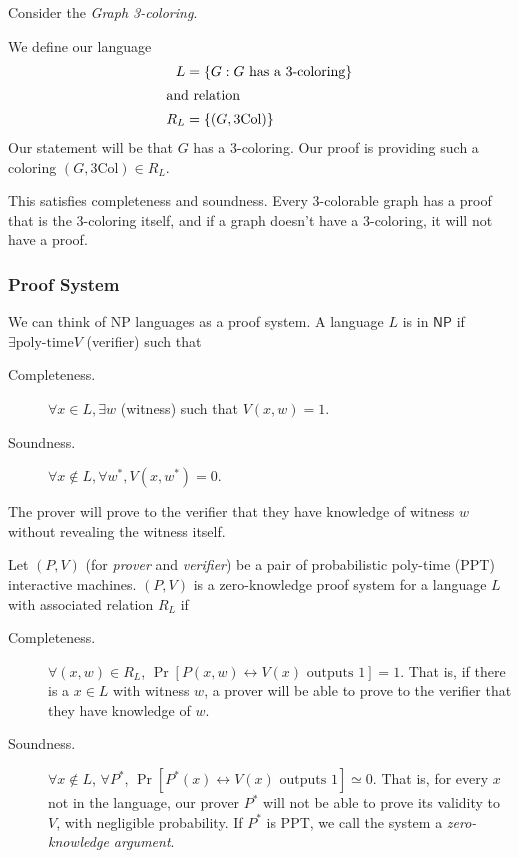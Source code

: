 \begin{example}
    Consider the \emph{Graph 3-coloring}.


    We define our language
    \begin{align*}
        L   & = \{G: G\text{ has a 3-coloring}\} \\
        \intertext{and relation}
        R_L & = \{(G, \textrm{3Col})\}
    \end{align*}
    Our statement will be that $G$ has a 3-coloring. Our proof is providing such a coloring $(G, \mathrm{3Col})\in R_L$.

    This satisfies completeness and soundness. Every 3-colorable graph has a proof that is the 3-coloring itself, and if a graph doesn't have a 3-coloring, it will not have a proof.
\end{example}

\subsubsection{Proof System}

We can think of NP languages as a proof system. A language $L$ is in $\mathsf{NP}$ if $\exists \text{poly-time} V$ (verifier) such that
\begin{description}
    \item[Completeness.] $\forall x\in L, \exists w$ (witness) such that $V(x, w) = 1$.
    \item[Soundness.] $\forall x\not\in L, \forall w^*, V(x, w^*) = 0$.
\end{description}
The prover will prove to the verifier that they have knowledge of witness $w$ without revealing the witness itself.

\begin{definition}
    Let $(P, V)$ (for \emph{prover} and \emph{verifier}) be a pair of probabilistic poly-time (PPT) interactive machines. $(P, V)$ is a zero-knowledge proof system for a language $L$ with associated relation $R_L$ if
    \begin{description}
        \item[Completeness.] $\forall (x, w)\in R_L$, $\Pr[P(x, w) \leftrightarrow V(x) \text{ outputs }1] = 1$. That is, if there is a $x\in L$ with witness $w$, a prover will be able to prove to the verifier that they have knowledge of $w$.
        \item[Soundness.] $\forall x\not\in L$, $\forall P^*$, $\Pr[P^*(x) \leftrightarrow V(x)\text{ outputs }1]\simeq 0$. That is, for every $x$ not in the language, our prover $P^*$ will not be able to prove its validity to $V$, with negligible probability. If $P^*$ is PPT, we call the system a \emph{zero-knowledge argument}.
    \end{description}

\end{definition}

